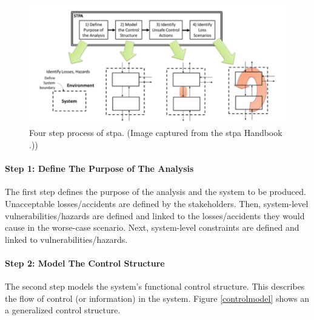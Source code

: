 \documentclass[../../main/main.tex]{subfiles}
\begin{document}
\begin{figure}[h]
\includegraphics[width=\linewidth]{../figures/4step}
\caption{\label{4step} Four step process of \gls{stpa}. (Image captured from the \gls{stpa} Handbook \cite{stpa}.))}
\end{figure}

\paragraph*{Step 1: Define The Purpose of The Analysis}
The first step defines the purpose of the analysis and the system to be produced.  Unacceptable losses/accidents are defined by the stakeholders.  Then, system-level vulnerabilities/hazards are defined and linked to the losses/accidents they would cause in the worse-case scenario.  Next, system-level constraints are defined and linked to vulnerabilities/hazards. 

\paragraph*{Step 2: Model The Control Structure}
The second step models the system's functional control structure.  This describes the flow of control (or information) in the system.  Figure \ref{controlmodel} shows an a generalized control structure.  
\end{document}
